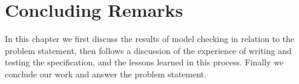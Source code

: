 \documentclass{uit-thesis}
\begin{document}

\chapter{Concluding Remarks}\label{ch:concluding-remarks}
In this chapter we first discuss the results of model checking in relation to the problem statement, then follows a discussion of the experience of writing and testing the specification, and the lessons learned in this process. Finally we conclude our work and answer the problem statement.
\end{document}
